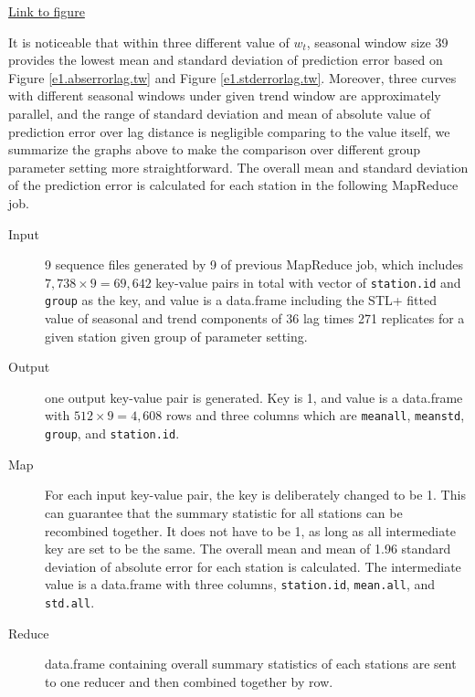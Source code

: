 \begin{framed}
\begin{center}
  \href{../plots/a1950/E1/tmax.std.vs.lag.tw.pdf}{Link to figure}
  \label{e1.stderrorlag.tw}
\end{center}
\end{framed}

It is noticeable that within three different value of $w_t$, seasonal window size
39 provides the lowest mean and standard deviation of prediction error based on 
Figure 
\href{../plots/a1950/E1/tmax.absmeans.vs.lag.tw.pdf}{\ref*{e1.abserrorlag.tw}} 
and Figure 
\href{../plots/a1950/E1/tmax.std.vs.lag.tw.pdf}{\ref*{e1.stderrorlag.tw}}.
Moreover, three curves with different seasonal windows under given trend window 
are approximately parallel, and the range of standard deviation and mean of 
absolute value of prediction error over lag distance is negligible comparing to 
the value itself, we summarize the graphs above to make the comparison over 
different group parameter setting more straightforward. The overall mean and 
standard deviation of the prediction error is calculated for each station in the
following MapReduce job.

\begin{description}
  \item[Input] 9 sequence files generated by 9 of previous MapReduce job, which 
  includes $7,738 \times 9 = 69,642$ key-value pairs in total with vector of 
  \texttt{station.id} and \texttt{group} as the key, and value is a data.frame 
  including the STL+ fitted value of seasonal and trend components of 36 lag 
  times 271 replicates for a given station given group of parameter setting.
  \item[Output] one output key-value pair is generated. Key is 1, and value is 
  a data.frame with $512 \times 9 = 4,608$ rows and three columns which are 
  \texttt{meanall}, \texttt{meanstd}, \texttt{group}, and \texttt{station.id}.
  \item[Map] For each input key-value pair, the key is deliberately changed to 
  be 1. This can guarantee that the summary statistic for all stations can be
  recombined together. It does not have to be 1, as long as all intermediate 
  key are set to be the same. The overall mean and mean of 1.96 standard 
  deviation of absolute error for each station is calculated. The intermediate 
  value is a data.frame with three columns, \texttt{station.id}, 
  \texttt{mean.all}, and \texttt{std.all}.
  \item[Reduce] data.frame containing overall summary statistics of each stations 
  are sent to one reducer and then combined together by row.
\end{description} 

